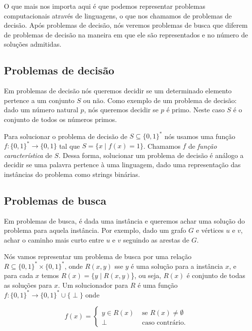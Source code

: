 O que mais nos importa aqui é que podemos representar problemas computacionais através de linguagens, o que nos chamamos de problemas de decisão. Após problemas de decisão, nós veremos problemas de busca que diferem de problemas de decisão na maneira em que ele são representados e no número de soluções admitidas.

\subsection{Problemas de decisão}

Em problemas de decisão nós queremos decidir se um determinado elemento pertence a um conjunto $S$ ou não. Como exemplo de um problema de decisão: dado um número natural $p$, nós queremos decidir se $p$ é primo. Neste caso $S$ é o conjunto de todos os números primos. 

Para solucionar o problema de decisão de $S \subseteq \{0, 1\}^{*}$ nós usamos uma função $f: \{0, 1\}^{*} \to \{0, 1\}$ tal que $S = \{x \mid f(x) = 1\}$. Chamamos $f$ de \emph{função característica} de $S$. Dessa forma, solucionar um problema de decisão é análogo a decidir se uma palavra pertence à uma linguagem, dado uma representação das instâncias do problema como strings binárias.

\subsection{Problemas de busca}

Em problemas de busca, é dada uma instância e queremos achar uma solução do problema para aquela instância. Por exemplo, dado um grafo $G$ e vértices $u$ e $v$, achar o caminho mais curto entre $u$ e $v$ seguindo as arestas de $G$.

Nós vamos representar um problema de busca por uma relação $R \subseteq \{0, 1\}^{*} \times \{0, 1\}^{*}$, onde $R(x, y)$ sse $y$ é uma solução para a instância $x$, e para cada $x$ temos $R(x) = \{y \mid R(x, y)$\}, ou seja, $R(x)$ é conjunto de todas as soluções para $x$. Um solucionador para $R$ é uma função $f: \{0, 1\}^{*} \to \{0, 1\}^{*} \cup \{ \perp \}$ onde

\begin{equation*}
    f(x) =
    \begin{cases}
        y \in R(x) & \text{ se } R(x) \neq \emptyset \\
        \perp & \text{ caso contrário}.
    \end{cases}
\end{equation*}


